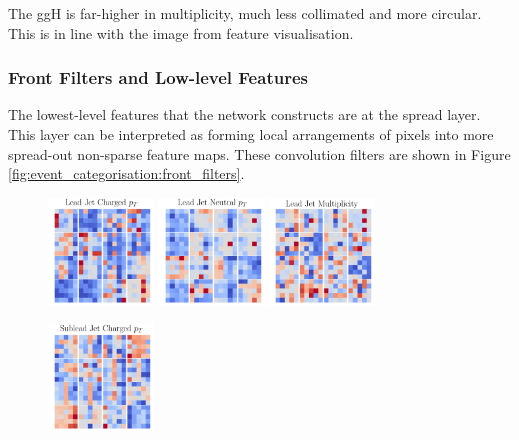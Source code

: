 The ggH is far-higher in multiplicity, much less collimated and more circular. This is in line with the image from feature visualisation. 


\subsubsection{Front Filters and Low-level Features}
The lowest-level features that the network constructs are at the spread layer. 
This layer can be interpreted as forming local arrangements of pixels into more spread-out non-sparse feature maps. 
These convolution filters are shown in Figure \ref{fig:event_categorisation:front_filters}.

\begin{figure}[h!]
    \begin{center}
        \includegraphics[width=0.25\textwidth]{figures/event_selection/front_filters_channel_0.pdf}
        \includegraphics[width=0.25\textwidth]{figures/event_selection/front_filters_channel_1.pdf}
        \includegraphics[width=0.25\textwidth]{figures/event_selection/front_filters_channel_2.pdf}
    \end{center}
    \begin{center}
        \includegraphics[width=0.25\textwidth]{figures/event_selection/front_filters_channel_3.pdf}

\end{center}
\end{figure}
